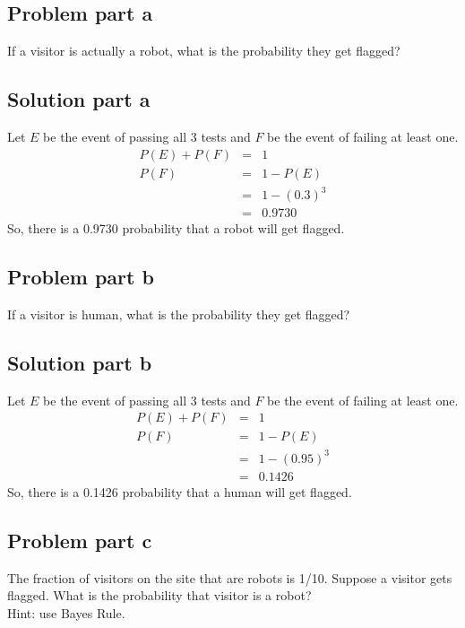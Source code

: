 \documentclass[12pt]{article}%
\begin{document}
\subsection*{Problem part a}
If a visitor is actually a robot, what is the probability they get flagged?
\subsection*{Solution part a}
Let $E$ be the event of passing all 3 tests and $F$ be the event of failing at least one.
\begin{eqnarray*}
P(E) + P(F) & = & 1 \\
P(F) & = & 1 - P(E) \\
	 & = & 1 - (0.3)^3 \\
	 & = & 0.9730
\end{eqnarray*}
So, there is a 0.9730 probability that a robot will get flagged.
\subsection*{Problem part b}
If a visitor is human, what is the probability they get flagged?
\subsection*{Solution part b}
Let $E$ be the event of passing all 3 tests and $F$ be the event of failing at least one.
\begin{eqnarray*}
P(E) + P(F) & = & 1 \\
P(F) & = & 1 - P(E) \\
	 & = & 1 - (0.95)^3 \\
	 & = & 0.1426
\end{eqnarray*}
So, there is a 0.1426 probability that a human will get flagged.
\subsection*{Problem part c}
The fraction of visitors on the site that are robots is 1/10. Suppose a visitor gets
flagged. What is the probability that visitor is a robot? \\ Hint: use Bayes Rule.
\end{document}
